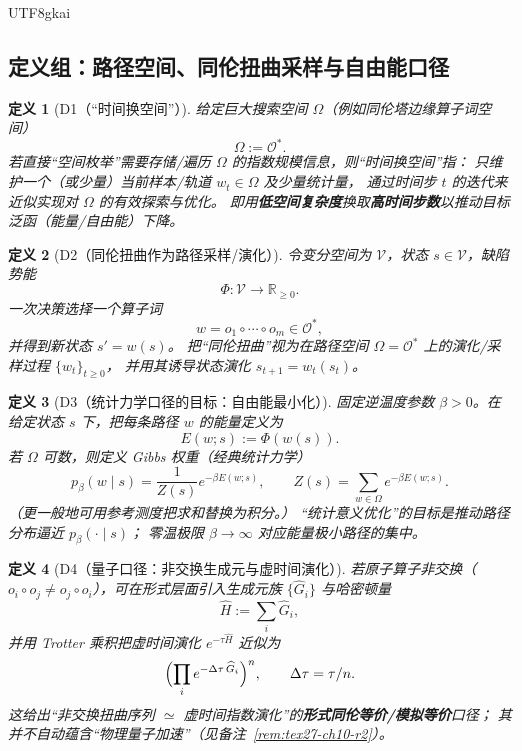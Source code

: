\documentclass[12pt]{article}
\newtheorem{definition}{定义}[section]
\newcommand{\RR}{\mathbb{R}}
\begin{document}
\begin{CJK*}{UTF8}{gkai}
\subsection{定义组：路径空间、同伦扭曲采样与自由能口径}
\label{subsec:tex27-ch10-defs}

\begin{definition}[D1（“时间换空间”）]
\label{def:tex27-ch10-d1}
给定巨大搜索空间 $\Omega$（例如同伦塔边缘算子词空间）
\[
  \Omega:=\mathcal{O}^{*}.
\]
若直接“空间枚举”需要存储/遍历 $\Omega$ 的指数规模信息，则“时间换空间”指：
只维护一个（或少量）当前样本/轨道 $w_t\in\Omega$ 及少量统计量，
通过时间步 $t$ 的迭代来近似实现对 $\Omega$ 的有效探索与优化。
即用\textbf{低空间复杂度}换取\textbf{高时间步数}以推动目标泛函（能量/自由能）下降。
\end{definition}

\begin{definition}[D2（同伦扭曲作为路径采样/演化）]
\label{def:tex27-ch10-d2}
令变分空间为 $\mathcal{V}$，状态 $s\in\mathcal{V}$，缺陷势能
\[
  \Phi:\mathcal{V}\to\RR_{\ge 0}.
\]
一次决策选择一个算子词
\[
  w=o_1\circ\cdots\circ o_m\in\mathcal{O}^{*},
\]
并得到新状态 $s' = w(s)$。
把“同伦扭曲”视为在路径空间 $\Omega=\mathcal{O}^*$ 上的演化/采样过程 $\{w_t\}_{t\ge 0}$，
并用其诱导状态演化 $s_{t+1}=w_t(s_t)$。
\end{definition}

\begin{definition}[D3（统计力学口径的目标：自由能最小化）]
\label{def:tex27-ch10-d3}
固定逆温度参数 $\beta>0$。在给定状态 $s$ 下，把每条路径 $w$ 的能量定义为
\[
  E(w;s):=\Phi(w(s)).
\]
若 $\Omega$ 可数，则定义 Gibbs 权重（经典统计力学）
\[
  p_\beta(w\mid s)=\frac{1}{Z(s)}e^{-\beta E(w;s)},
  \qquad
  Z(s)=\sum_{w\in\Omega}e^{-\beta E(w;s)}.
\]
（更一般地可用参考测度把求和替换为积分。）
“统计意义优化”的目标是推动路径分布逼近 $p_\beta(\cdot\mid s)$；
零温极限 $\beta\to\infty$ 对应能量极小路径的集中。
\end{definition}

\begin{definition}[D4（量子口径：非交换生成元与虚时间演化）]
\label{def:tex27-ch10-d4}
若原子算子非交换（$o_i\circ o_j\neq o_j\circ o_i$），可在形式层面引入生成元族 $\{\widehat{G}_i\}$ 与哈密顿量
\[
  \widehat{H}:=\sum_i \widehat{G}_i,
\]
并用 Trotter 乘积把虚时间演化 $e^{-\tau\widehat{H}}$ 近似为
\[
  \Bigl(\prod_i e^{-\Delta\tau\,\widehat{G}_{i}}\Bigr)^{n},
  \qquad
  \Delta\tau=\tau/n.
\]
这给出“非交换扭曲序列 $\simeq$ 虚时间指数演化”的\textbf{形式同伦等价/模拟等价}口径；
其并不自动蕴含“物理量子加速”（见备注~\ref{rem:tex27-ch10-r2}）。
\end{definition}


\end{CJK*}
\end{document}
